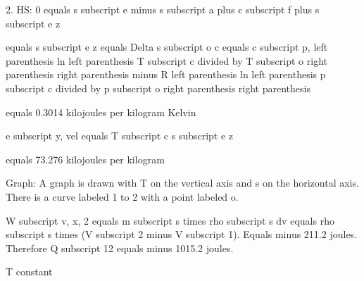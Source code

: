 2. HS: 0 equals s subscript e minus s subscript a plus c subscript f plus s subscript e z

equals s subscript e z equals Delta s subscript o c equals c subscript p, left parenthesis ln left parenthesis T subscript c divided by T subscript o right parenthesis right parenthesis minus R left parenthesis ln left parenthesis p subscript c divided by p subscript o right parenthesis right parenthesis

equals 0.3014 kilojoules per kilogram Kelvin

e subscript y, vel equals T subscript c s subscript e z

equals 73.276 kilojoules per kilogram

Graph: A graph is drawn with T on the vertical axis and s on the horizontal axis. There is a curve labeled 1 to 2 with a point labeled o.

W subscript v, x, 2 equals m subscript s times rho subscript s dv equals rho subscript s times (V subscript 2 minus V subscript 1).
Equals minus 211.2 joules.
Therefore Q subscript 12 equals minus 1015.2 joules.

T constant